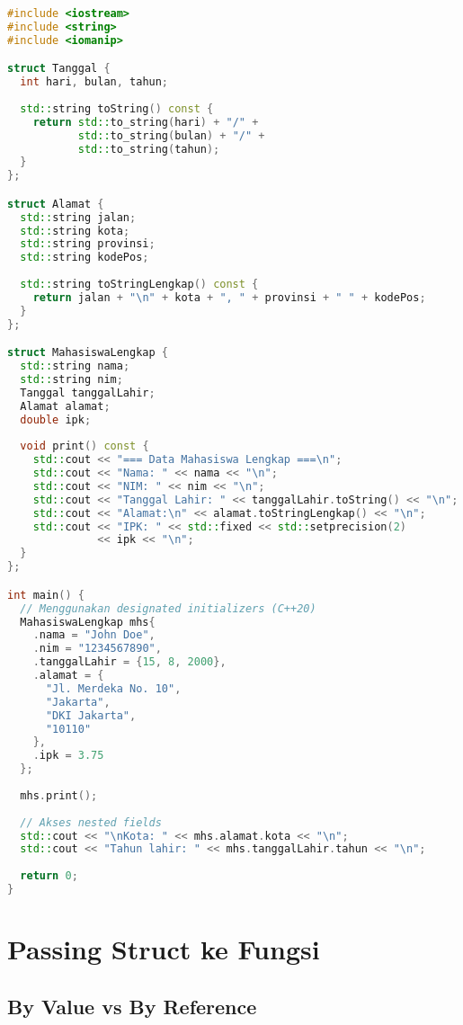 \documentclass[../main.tex]{subfiles}
\begin{document}
\begin{lstlisting}[language=C++, caption={Nested struct di C++}]
#include <iostream>
#include <string>
#include <iomanip>

struct Tanggal {
  int hari, bulan, tahun;
  
  std::string toString() const {
    return std::to_string(hari) + "/" + 
           std::to_string(bulan) + "/" + 
           std::to_string(tahun);
  }
};

struct Alamat {
  std::string jalan;
  std::string kota;
  std::string provinsi;
  std::string kodePos;
  
  std::string toStringLengkap() const {
    return jalan + "\n" + kota + ", " + provinsi + " " + kodePos;
  }
};

struct MahasiswaLengkap {
  std::string nama;
  std::string nim;
  Tanggal tanggalLahir;
  Alamat alamat;
  double ipk;
  
  void print() const {
    std::cout << "=== Data Mahasiswa Lengkap ===\n";
    std::cout << "Nama: " << nama << "\n";
    std::cout << "NIM: " << nim << "\n";
    std::cout << "Tanggal Lahir: " << tanggalLahir.toString() << "\n";
    std::cout << "Alamat:\n" << alamat.toStringLengkap() << "\n";
    std::cout << "IPK: " << std::fixed << std::setprecision(2) 
              << ipk << "\n";
  }
};

int main() {
  // Menggunakan designated initializers (C++20)
  MahasiswaLengkap mhs{
    .nama = "John Doe",
    .nim = "1234567890",
    .tanggalLahir = {15, 8, 2000},
    .alamat = {
      "Jl. Merdeka No. 10",
      "Jakarta",
      "DKI Jakarta",
      "10110"
    },
    .ipk = 3.75
  };
  
  mhs.print();
  
  // Akses nested fields
  std::cout << "\nKota: " << mhs.alamat.kota << "\n";
  std::cout << "Tahun lahir: " << mhs.tanggalLahir.tahun << "\n";
  
  return 0;
}
\end{lstlisting}

\section{Passing Struct ke Fungsi}

\subsection{By Value vs By Reference}
\end{document}
